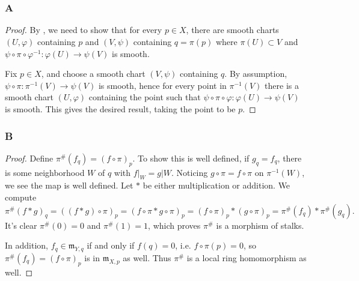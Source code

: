 \documentclass{article}
\newcommand{\frkm}{\mathfrak{m}}
\begin{document}
\section{}
\subsection{}
\subsubsection{A}\label{3.1.A}
\begin{proof}
    By \cite{Lee_Manifolds}, we need to show that for every $p\in X$, there are smooth charts $(U,\varphi)$ containing $p$ and $(V,\psi)$ containing $q=\pi(p)$ where $\pi(U)\subset V$ and $\psi\circ \pi \circ \varphi^{-1}:\varphi(U)\to \psi(V)$ is smooth.

    Fix $p\in X$, and choose a smooth chart $(V,\psi)$ containing $q$. By assumption, $\psi \circ \pi:\pi^{-1}(V)\to \psi(V)$ is smooth, hence for every point in $\pi^{-1}(V)$ there is a smooth chart $(U,\varphi)$ containing the point such that $\psi \circ \pi \circ \varphi:\varphi(U) \to \psi(V)$ is smooth. This gives the desired result, taking the point to be $p$.
\end{proof}
\subsubsection{B}\label{3.1.B}
\begin{proof}
    Define $\pi^\#(f_q)=(f\circ \pi)_p$. To show this is well defined, if $g_q=f_q$, there is some neighborhood $W$ of $q$ with $f\vert_W = g\vert W$. Noticing $g\circ \pi = f\circ \pi$ on $\pi^{-1}(W)$, we see the map is well defined. Let $*$ be either multiplication or addition. We compute
    \[
    \pi^\#(f*g)_q = ((f*g)\circ \pi)_p = (f\circ \pi * g\circ \pi)_p=(f\circ \pi)_p * (g\circ \pi)_p=\pi^\#(f_q)*\pi^\#(g_q).
    \]
    It's clear $\pi^\#(0)=0$ and $\pi^\#(1)=1$, which proves $\pi^\#$ is a morphism of stalks.

    In addition, $f_q\in \frkm_{Y,q}$ if and only if $f(q)=0$, i.e. $f\circ \pi(p)=0$, so $\pi^\#(f_q)=(f\circ \pi)_p$ is in $\frkm_{X,p}$ as well. Thus $\pi^\#$ is a local ring homomorphism as well.
\end{proof}
\subsection{}
\end{document}
